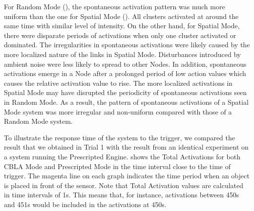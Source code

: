 \FloatBarrier
For Random Mode (), the spontaneous activation pattern was much more uniform than the one for Spatial Mode (). All clusters activated at around the same time with similar level of intensity. On the other hand, for Spatial Mode, there were disparate periods of activations when only one cluster activated or dominated. The irregularities in spontaneous activations were likely caused by the more localized nature of the links in Spatial Mode. Disturbances introduced by ambient noise were less likely to spread to other Nodes. In addition, spontaneous activations emerge in a Node after a prolonged period of low action values which causes the relative activation value to rise. The more localized activations in Spatial Mode may have disrupted the periodicity of spontaneous activations seen in Random Mode. As a result, the pattern of spontaneous activations of a Spatial Mode system was more irregular and non-uniform compared with those of a Random Mode system.

To illustrate the response time of the system to the trigger, we compared the result that we obtained in Trial 1 with the result from an identical experiment on a system running the Prescripted Engine.  shows the Total Activations for both CBLA Mode and Prescripted Mode in the time interval close to the time of trigger. The magenta line on each graph indicates the time period when an object is placed in front of the sensor. Note that Total Activation values are calculated in time intervals of 1s. This means that, for instance, activations between 450s and 451s would be included in the activations at 450s. 

